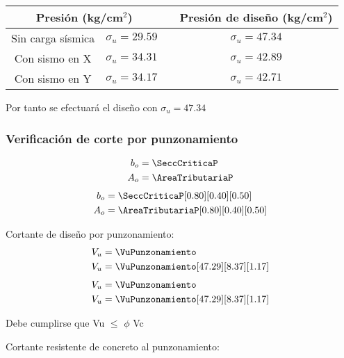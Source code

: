 \documentclass{article}%
\begin{document}
\begin{table}[h!]
    \centering
    \begin{tabular}{ccc|c} \toprule
         \multicolumn{2}{c}{\textbf{Presión (kg/cm$^2$)}}   && \textbf{Presión de diseño (kg/cm$^2$)} \\ \midrule
        Sin carga sísmica   &   $\sigma_u =29.59 $  &&   $\sigma_u = 47.34$ \\ 
        Con sismo en X      &   $\sigma_u =34.31 $  &&   $\sigma_u = 42.89$ \\
        Con sismo en Y      &   $\sigma_u =34.17 $  &&   $\sigma_u = 42.71$ \\\bottomrule
    \end{tabular}
\end{table}

Por tanto se efectuará el diseño con $\sigma_u = 47.34$


\subsubsection{Verificación de corte por punzonamiento}
\begin{align}
	b_o &= \SeccCriticaP \\
	A_o &= \AreaTributariaP
\end{align}
\begin{align*}
	b_o &= \SeccCriticaP[0.80][0.40][0.50] \\
	A_o &= \AreaTributariaP[0.80][0.40][0.50]
\end{align*}

Cortante de diseño por punzonamiento:
\begin{align}
	V_u &= \VuPunzonamiento \\
	V_u &= \VuPunzonamiento[47.29][8.37][1.17]
\end{align}
\begin{align}
	V_u &= \VuPunzonamiento \\
	V_u &= \VuPunzonamiento[47.29][8.37][1.17]
\end{align}

Debe cumplirse que Vu $\leq$ $\phi$ Vc

Cortante resistente de concreto al punzonamiento:
\end{document}
